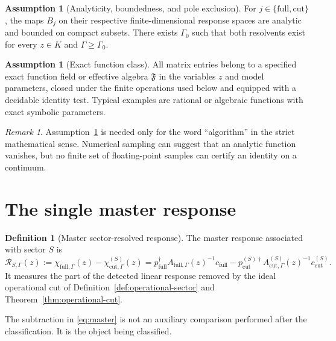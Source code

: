 \documentclass[11pt]{article}
\theoremstyle{definition}
\newtheorem{definition}[theorem]{Definition}
\newtheorem{assumption}[theorem]{Assumption}
\theoremstyle{remark}
\newtheorem{remark}[theorem]{Remark}
\theoremstyle{plain}
\newcommand{\R}{\mathcal R}
\newcommand{\full}{\mathrm{full}}
\newcommand{\cut}{\mathrm{cut}}
\begin{document}
\begin{assumption}[Analyticity, boundedness, and pole exclusion]\label{ass:analytic}
For $j\in\{\full,\cut\}$, the maps $B_j$ on their respective finite-dimensional response spaces are analytic and bounded on compact subsets.  There exists $\Gamma_0$ such that both resolvents exist for every $z\in K$ and $\Gamma\ge\Gamma_0$.
\end{assumption}

\begin{assumption}[Exact function class]\label{ass:exact}
All matrix entries belong to a specified exact function field or effective algebra $\mathfrak F$ in the variables $z$ and model parameters, closed under the finite operations used below and equipped with a decidable identity test.  Typical examples are rational or algebraic functions with exact symbolic parameters.
\end{assumption}

\begin{remark}
Assumption~\ref{ass:exact} is needed only for the word ``algorithm'' in the strict mathematical sense.  Numerical sampling can suggest that an analytic function vanishes, but no finite set of floating-point samples can certify an identity on a continuum.
\end{remark}

\section{The single master response}

\begin{definition}[Master sector-resolved response]\label{def:master}
The master response associated with sector $S$ is
\begin{equation}\label{eq:master}
  \boxed{
  \R_{S,\Gamma}(z)
  :=\chi_{\full,\Gamma}(z)-\chi_{\cut,\Gamma}^{(S)}(z)
  =p_{\full}^\dagger A_{\full,\Gamma}(z)^{-1}c_{\full}
  -p_{\cut}^{(S)\dagger}A_{\cut,\Gamma}^{(S)}(z)^{-1}c_{\cut}^{(S)} .}
\end{equation}
It measures the part of the detected linear response removed by the ideal operational cut of Definition~\ref{def:operational-sector} and Theorem~\ref{thm:operational-cut}.
\end{definition}

The subtraction in \eqref{eq:master} is not an auxiliary comparison performed after the classification.  It is the object being classified.
\end{document}
